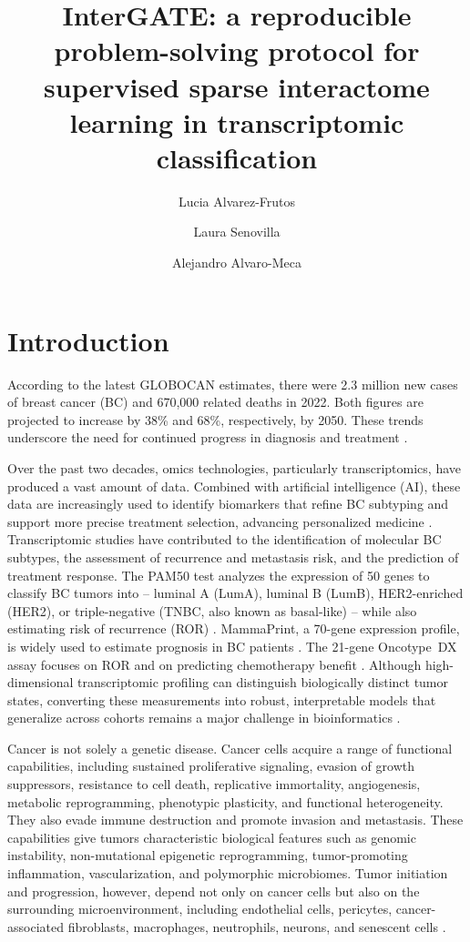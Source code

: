 \documentclass[unnumsec,webpdf,modern,large]{oup-authoring-template}
\title[InterGATE: supervised sparse interactome learning]{InterGATE: a reproducible problem-solving protocol for supervised sparse interactome learning in transcriptomic classification}
\author[1]{Lucia Alvarez-Frutos}
\author[1,*]{Laura Senovilla}
\author[2,3,*]{Alejandro Alvaro-Meca}
\begin{document}
\maketitle


\section{Introduction}
According to the latest  GLOBOCAN estimates, there were 2.3 million new cases of breast cancer (BC) and 670,000 related deaths in 2022. Both figures are projected to increase by 38\% and 68\%, respectively, by 2050. These trends underscore the need for continued progress in diagnosis and treatment \citep{Bray2024,Freihat2025,Kim2025}.


Over the past two decades, omics technologies, particularly transcriptomics, have produced a vast amount of data. Combined with artificial intelligence (AI), these data are increasingly used to identify biomarkers that refine BC subtyping and support more precise treatment selection, advancing personalized medicine \citep{Ran2025,Sammut2022,Binder2021}. Transcriptomic studies have contributed to the identification of molecular BC subtypes, the assessment of recurrence and metastasis risk, and the prediction of treatment response. The PAM50 test analyzes the expression of 50 genes to classify BC tumors into -- luminal A (LumA), luminal B (LumB), HER2-enriched (HER2), or triple-negative (TNBC, also known as basal-like) -- while also estimating risk of recurrence (ROR) \citep{Korde2010}. MammaPrint, a 70-gene expression profile, is widely used to estimate prognosis in BC patients \citep{Glas2006}. The 21-gene Oncotype~DX assay focuses on ROR and on predicting chemotherapy benefit \citep{Cobleigh2005}. Although high-dimensional transcriptomic profiling can distinguish biologically distinct tumor states, converting these measurements into robust, interpretable models that generalize across cohorts remains a major challenge in bioinformatics \citep{Polyak2011Heterogeneity,Perou2000MolecularPortraits,TCGA2012BRCA}. 

Cancer is not solely a genetic disease. Cancer cells acquire a range of functional capabilities, including sustained proliferative signaling, evasion of growth suppressors, resistance to cell death, replicative immortality, angiogenesis, metabolic reprogramming, phenotypic plasticity, and functional heterogeneity. They also evade immune destruction and promote invasion and metastasis. These capabilities give tumors characteristic biological features such as genomic instability, non-mutational epigenetic reprogramming, tumor-promoting inflammation, vascularization, and polymorphic microbiomes. Tumor initiation and progression, however, depend not only on cancer cells but also on the surrounding microenvironment, including endothelial cells, pericytes, cancer-associated fibroblasts, macrophages, neutrophils, neurons, and senescent cells \citep{Hanahan2026}. 
\end{document}
